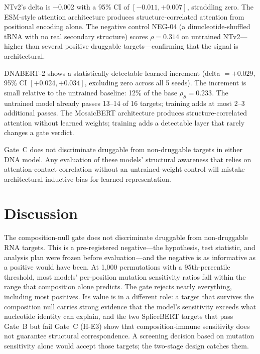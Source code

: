 \documentclass[11pt]{article}
\begin{document}
NTv2's delta is $-0.002$ with a 95\% CI of $[-0.011, +0.007]$, straddling
zero. The ESM-style attention architecture produces structure-correlated
attention from positional encoding alone. The negative control NEG-04
(a dinucleotide-shuffled tRNA with no real secondary structure) scores
$\rho = 0.314$ on untrained NTv2---higher than several positive druggable
targets---confirming that the signal is architectural.

DNABERT-2 shows a statistically detectable learned increment (delta $=
+0.029$, 95\% CI $[+0.024, +0.034]$, excluding zero across all 5 seeds).
The increment is small relative to the untrained baseline: 12\% of the
base $\rho_S = 0.233$. The untrained model already passes 13--14 of 16
targets; training adds at most 2--3 additional passes. The MosaicBERT
architecture produces structure-correlated attention without learned weights;
training adds a detectable layer that rarely changes a gate verdict.

Gate~C does not discriminate druggable from non-druggable targets in either
DNA model. Any evaluation of these models' structural awareness that relies
on attention-contact correlation without an untrained-weight control will
mistake architectural inductive bias for learned representation.


\section{Discussion}

The composition-null gate does not discriminate druggable from non-druggable
RNA targets. This is a pre-registered negative---the hypothesis, test
statistic, and analysis plan were frozen before evaluation---and the negative
is as informative as a positive would have been. At 1,000 permutations with
a 95th-percentile threshold, most models' per-position mutation sensitivity
ratios fall within the range that composition alone predicts. The gate
rejects nearly everything, including most positives. Its value is in a
different role: a target that survives the composition null carries strong
evidence that the model's sensitivity exceeds what nucleotide identity can
explain, and the two SpliceBERT targets that pass Gate~B but fail Gate~C
(H-E3) show that composition-immune sensitivity does not guarantee structural
correspondence. A screening decision based on mutation sensitivity alone
would accept those targets; the two-stage design catches them.
\end{document}
